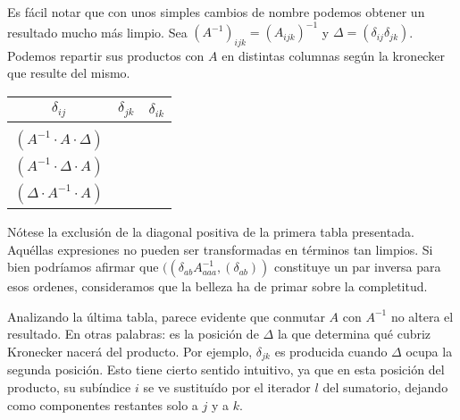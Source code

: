 \vspace{0.5cm}

Es fácil notar que con unos simples cambios de nombre podemos obtener un resultado mucho más limpio. Sea $(A^{-1})_{ijk} = (A_{ijk})^{-1}$ y $\Delta = (\delta_{ij}\delta_{jk})$. Podemos repartir sus productos con $A$ en distintas columnas según la kronecker que resulte del mismo.

\vspace{0.5cm}
\begin{tabular}{ |c|c|c| } 
	\hline
	$\delta_{ij}$ & $\delta_{jk}$ & $\delta_{ik}$ \\
	\hline
	\makecell{$(A \cdot A^{-1} \cdot \Delta)$ \\ $(A^{-1} \cdot A \cdot \Delta)$} &
	\makecell{$(A \cdot \Delta \cdot A^{-1})$ \\ $(A^{-1} \cdot \Delta \cdot A)$} &
	\makecell{$(\Delta \cdot A \cdot A^{-1})$ \\ $(\Delta \cdot A^{-1} \cdot A)$} \\
	\hline
\end{tabular}
\vspace{0.5cm}

Nótese la exclusión de la diagonal positiva de la primera tabla presentada. Aquéllas expresiones no pueden ser transformadas en términos tan limpios. Si bien podríamos afirmar que $((\delta_{ab} A^{-1}_{aaa}, (\delta_{ab}))$ constituye un par inversa para esos ordenes, consideramos que la belleza ha de primar sobre la completitud.

Analizando la última tabla, parece evidente que conmutar $A$ con $A^{-1}$ no altera el resultado. En otras palabras: es la posición de $\Delta$ la que determina qué cubriz Kronecker nacerá del producto. Por ejemplo, $\delta_{jk}$ es producida cuando $\Delta$ ocupa la segunda posición. Esto tiene cierto sentido intuitivo, ya que en esta posición del producto, su subíndice $i$ se ve sustituído por el iterador $l$ del sumatorio, dejando como componentes restantes solo a $j$ y a $k$.

\newpage
